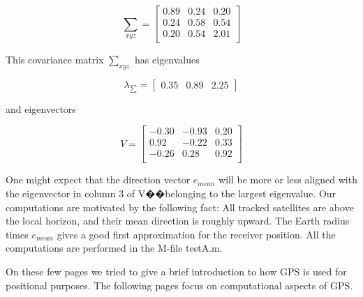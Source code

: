 $$
\sum_{xyz}=\begin{bmatrix}
0.89& 0.24& 0.20\\
0.24& 0.58& 0.54\\
0.20& 0.54& 2.01\\
\end{bmatrix}
$$

This covariance matrix $\sum_{xyz}$ has eigenvalues

$$
\lambda_{\sum}=\begin{bmatrix}
0.35& 0.89& 2.25
\end{bmatrix}
$$

and eigenvectors

$$
V=\begin{bmatrix}
-0.30& -0.93& 0.20\\
0.92 &-0.22& 0.33\\
-0.26& 0.28& 0.92\\
\end{bmatrix}
$$

One might expect that the direction vector $e_{mean}$ will be more or less aligned with the eigenvector in column 3 of V��belonging to the largest eigenvalue. Our computations are motivated by the following fact: All tracked satellites are above the local horizon, and their mean direction is roughly upward. The Earth radius times $e_{mean}$ gives a good first approximation for the receiver position. All the computations are performed in the M-file testA.m.

On these few pages we tried to give a brief introduction to how GPS is used for positional purposes. The following pages focus on computational aspects of GPS.